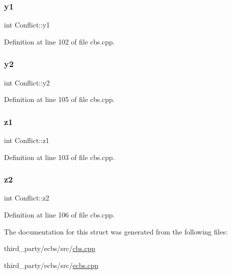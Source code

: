 \mbox{\label{struct_conflict_a48f6033f035b152132cbbc0081a9216b}} 
\subsubsection{\texorpdfstring{y1}{y1}}
{\footnotesize\ttfamily int Conflict\+::y1}



Definition at line 102 of file cbs.\+cpp.

\mbox{\label{struct_conflict_aa0406a6a50889d8c1803b6ec11c21230}} 
\subsubsection{\texorpdfstring{y2}{y2}}
{\footnotesize\ttfamily int Conflict\+::y2}



Definition at line 105 of file cbs.\+cpp.

\mbox{\label{struct_conflict_ab5d52bb95d71415d8154c0d9271b703c}} 
\subsubsection{\texorpdfstring{z1}{z1}}
{\footnotesize\ttfamily int Conflict\+::z1}



Definition at line 103 of file cbs.\+cpp.

\mbox{\label{struct_conflict_afd42fecf78db0ec2a73bc9eadc554960}} 
\subsubsection{\texorpdfstring{z2}{z2}}
{\footnotesize\ttfamily int Conflict\+::z2}



Definition at line 106 of file cbs.\+cpp.



The documentation for this struct was generated from the following files\+:\begin{DoxyCompactItemize}
\item 
third\+\_\+party/ecbs/src/\hyperlink{cbs_8cpp}{cbs.\+cpp}\item 
third\+\_\+party/ecbs/src/\hyperlink{ecbs_8cpp}{ecbs.\+cpp}\end{DoxyCompactItemize}
